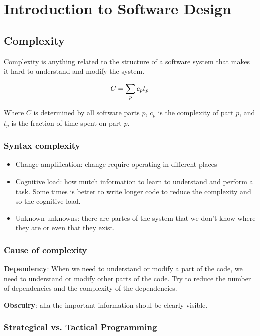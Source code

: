 \chapter{Introduction to Software Design}

\section{Complexity}
Complexity is anything related to the structure of a software system that makes
it hard to understand and modify the system.

\begin{equation*}
  \centering
  C = \sum_p c_pt_p
\end{equation*}

Where $C$ is determined by all software parts $p$, $c_p$ is the complexity of part $p$,
and $t_p$ is the fraction of time spent on part $p$.

\subsection{Syntax complexity}

\begin{itemize}
  \item Change amplification: change require operating in different places
  \item Cognitive load: how mutch information to learn to understand and perform a task. Some times is better to write longer code to reduce the complexity and so the cognitive load.
  \item Unknown unknowns: there are partes of the system that we don't know where they are or even that they exist.
\end{itemize}

\subsection{Cause of complexity}

\textbf{Dependency}: When we need to understand or modify a part of the code, we need to understand or modify other parts of the code. Try to reduce the number of dependencies and the complexity of the dependencies.

\textbf{Obscuiry}: alla the important information shoul be clearly visible.

\subsection{Strategical vs. Tactical Programming}

